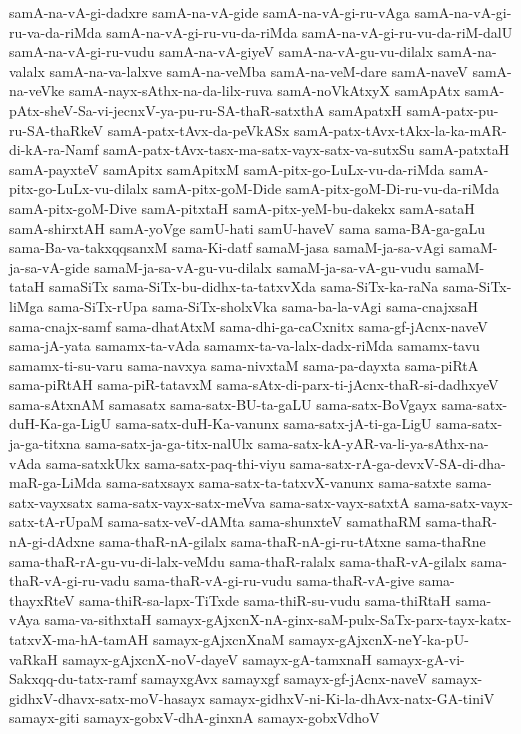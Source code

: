 {samA-na-vA-gi-dadxre
samA-na-vA-gide
samA-na-vA-gi-ru-vAga
samA-na-vA-gi-ru-va-da-riMda
samA-na-vA-gi-ru-vu-da-riMda
samA-na-vA-gi-ru-vu-da-riM-dalU
samA-na-vA-gi-ru-vudu
samA-na-vA-giyeV
samA-na-vA-gu-vu-dilalx
samA-na-valalx
samA-na-va-lalxve
samA-na-veMba
samA-na-veM-dare
samA-naveV
samA-na-veVke
samA-nayx-sAthx-na-da-lilx-ruva
samA-noVkAtxyX
samApAtx
samA-pAtx-sheV-Sa-vi-jecnxV-ya-pu-ru-SA-thaR-satxthA
samApatxH
samA-patx-pu-ru-SA-thaRkeV
samA-patx-tAvx-da-peVkASx
samA-patx-tAvx-tAkx-la-ka-mAR-di-kA-ra-Namf
samA-patx-tAvx-tasx-ma-satx-vayx-satx-va-sutxSu
samA-patxtaH
samA-payxteV
samApitx
samApitxM
samA-pitx-go-LuLx-vu-da-riMda
samA-pitx-go-LuLx-vu-dilalx
samA-pitx-goM-Dide
samA-pitx-goM-Di-ru-vu-da-riMda
samA-pitx-goM-Dive
samA-pitxtaH
samA-pitx-yeM-bu-dakekx
samA-sataH
samA-shirxtAH
samA-yoVge
samU-hati
samU-haveV
sama
sama-BA-ga-gaLu
sama-Ba-va-takxqqsanxM
sama-Ki-datf
samaM-jasa
samaM-ja-sa-vAgi
samaM-ja-sa-vA-gide
samaM-ja-sa-vA-gu-vu-dilalx
samaM-ja-sa-vA-gu-vudu
samaM-tataH
samaSiTx
sama-SiTx-bu-didhx-ta-tatxvXda
sama-SiTx-ka-raNa
sama-SiTx-liMga
sama-SiTx-rUpa
sama-SiTx-sholxVka
sama-ba-la-vAgi
sama-cnajxsaH
sama-cnajx-samf
sama-dhatAtxM
sama-dhi-ga-caCxnitx
sama-gf-jAcnx-naveV
sama-jA-yata
samamx-ta-vAda
samamx-ta-va-lalx-dadx-riMda
samamx-tavu
samamx-ti-su-varu
sama-navxya
sama-nivxtaM
sama-pa-dayxta
sama-piRtA
sama-piRtAH
sama-piR-tatavxM
sama-sAtx-di-parx-ti-jAcnx-thaR-si-dadhxyeV
sama-sAtxnAM
samasatx
sama-satx-BU-ta-gaLU
sama-satx-BoVgayx
sama-satx-duH-Ka-ga-LigU
sama-satx-duH-Ka-vanunx
sama-satx-jA-ti-ga-LigU
sama-satx-ja-ga-titxna
sama-satx-ja-ga-titx-nalUlx
sama-satx-kA-yAR-va-li-ya-sAthx-na-vAda
sama-satxkUkx
sama-satx-paq-thi-viyu
sama-satx-rA-ga-devxV-SA-di-dha-maR-ga-LiMda
sama-satxsayx
sama-satx-ta-tatxvX-vanunx
sama-satxte
sama-satx-vayxsatx
sama-satx-vayx-satx-meVva
sama-satx-vayx-satxtA
sama-satx-vayx-satx-tA-rUpaM
sama-satx-veV-dAMta
sama-shunxteV
samathaRM
sama-thaR-nA-gi-dAdxne
sama-thaR-nA-gilalx
sama-thaR-nA-gi-ru-tAtxne
sama-thaRne
sama-thaR-rA-gu-vu-di-lalx-veMdu
sama-thaR-ralalx
sama-thaR-vA-gilalx
sama-thaR-vA-gi-ru-vadu
sama-thaR-vA-gi-ru-vudu
sama-thaR-vA-give
sama-thayxRteV
sama-thiR-sa-lapx-TiTxde
sama-thiR-su-vudu
sama-thiRtaH
sama-vAya
sama-va-sithxtaH
samayx-gAjxcnX-nA-ginx-saM-pulx-SaTx-parx-tayx-katx-tatxvX-ma-hA-tamAH
samayx-gAjxcnXnaM
samayx-gAjxcnX-neY-ka-pU-vaRkaH
samayx-gAjxcnX-noV-dayeV
samayx-gA-tamxnaH
samayx-gA-vi-Sakxqq-du-tatx-ramf
samayxgAvx
samayxgf
samayx-gf-jAcnx-naveV
samayx-gidhxV-dhavx-satx-moV-hasayx
samayx-gidhxV-ni-Ki-la-dhAvx-natx-GA-tiniV
samayx-giti
samayx-gobxV-dhA-ginxnA
samayx-gobxVdhoV
}
